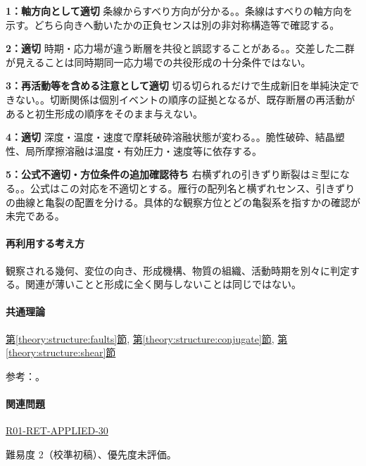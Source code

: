 \noindent\textbf{1：軸方向として適切} 条線からすべり方向が分かる。。条線はすべりの軸方向を示す。どちら向きへ動いたかの正負センスは別の非対称構造等で確認する。\par

\noindent\textbf{2：適切} 時期・応力場が違う断層を共役と誤認することがある。。交差した二群が見えることは同時期同一応力場での共役形成の十分条件ではない。\par

\noindent\textbf{3：再活動等を含める注意として適切} 切る切られるだけで生成新旧を単純決定できない。。切断関係は個別イベントの順序の証拠となるが、既存断層の再活動があると初生形成の順序をそのまま与えない。\par

\noindent\textbf{4：適切} 深度・温度・速度で摩耗破砕溶融状態が変わる。。脆性破砕、結晶塑性、局所摩擦溶融は温度・有効圧力・速度等に依存する。\par

\noindent\textbf{5：公式不適切・方位条件の追加確認待ち} 右横ずれの引きずり断裂はミ型になる。。公式はこの対応を不適切とする。雁行の配列名と横ずれセンス、引きずりの曲線と亀裂の配置を分ける。具体的な観察方位とどの亀裂系を指すかの確認が未完である。\par

\paragraph{再利用する考え方} 観察される幾何、変位の向き、形成機構、物質の組織、活動時期を別々に判定する。関連が薄いことと形成に全く関与しないことは同じではない。

\paragraph{共通理論} \hyperref[theory:structure:faults]{第\ref*{theory:structure:faults}節}, \hyperref[theory:structure:conjugate]{第\ref*{theory:structure:conjugate}節}, \hyperref[theory:structure:shear]{第\ref*{theory:structure:shear}節}

\par 参考：\cite{str_shear,str_faultrocks}。

\paragraph{関連問題} \hyperref[q:r01-ret-applied-30]{R01-RET-APPLIED-30}

\par 難易度 2（校準初稿）、優先度未評価。

